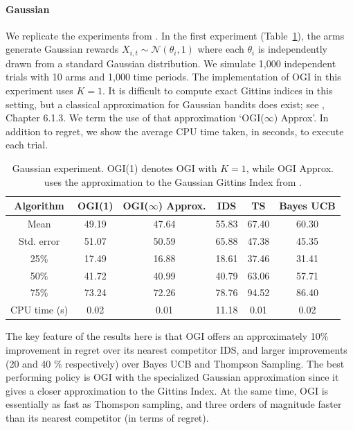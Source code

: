 \paragraph{Gaussian}We replicate the experiments from \cite{russo2014learning}. In the first experiment (Table~\ref{table:gaussian_experiment1}), the arms generate Gaussian rewards  $X_{i,t} \sim \mathcal{N}(\theta_i, 1)$ where each $\theta_i$ is independently drawn from a standard Gaussian distribution. We simulate 1,000 independent trials with 10 arms and 1,000 time periods. The implementation of OGI in this experiment uses $K = 1$. It is difficult to compute exact Gittins indices in this setting, but a classical approximation for Gaussian bandits does exist; see \cite{powell2012optimal}, Chapter 6.1.3. We term the use of that approximation `OGI($\infty$) Approx'.  In addition to regret, we  show the average CPU time taken, in seconds, to execute each trial.

\begin{table}[h!]
	\centering
	\begin{tabular}{cccccc} \toprule
		\textbf{Algorithm}  & \textbf{OGI(1)} & \textbf{OGI($\infty$) Approx.} & \textbf{IDS} & \textbf{TS} & \textbf{Bayes UCB}\\ \midrule
		Mean   & 49.19 & 47.64  &  55.83 & 67.40 & 60.30  \\ 
		Std. error  & 51.07 & 50.59 & 65.88 & 47.38 & 45.35 \\ 
		25\%  & 17.49 & 16.88  & 18.61 & 37.46 & 31.41 \\
		50\%   & 41.72 & 40.99 & 40.79 & 63.06 & 57.71 \\ 
		75\%  & 73.24 & 72.26 & 78.76 & 94.52 & 86.40 \\ 
		CPU time (s) & 0.02 & 0.01 & 11.18 & 0.01 & 0.02 \\
		\bottomrule
	\end{tabular}
	\caption[Table caption text]{Gaussian experiment. OGI(1) denotes OGI with $K =1$, while OGI Approx. uses the approximation to the Gaussian Gittins Index from \cite{powell2012optimal}.}
	\label{table:gaussian_experiment1}
\end{table}

The key feature of the results here is that OGI offers an approximately 10\% improvement in regret over its nearest competitor IDS, and larger improvements (20 and 40 \% respectively) over Bayes UCB and Thompson Sampling. The best performing policy is OGI with the specialized Gaussian approximation since it gives a closer approximation to the Gittins Index. At the same time, OGI is essentially as fast as Thomspon sampling, and three orders of magnitude faster than its nearest competitor (in terms of regret). 


